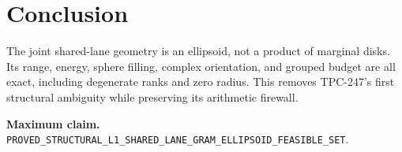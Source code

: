 \documentclass[11pt]{article}
\theoremstyle{remark}
\begin{document}
\section{Conclusion}

The joint shared-lane geometry is an ellipsoid, not a product of marginal
disks.  Its range, energy, sphere filling, complex orientation, and grouped
budget are all exact, including degenerate ranks and zero radius.  This removes
TPC-247's first structural ambiguity while preserving its arithmetic firewall.

\medskip
\noindent\textbf{Maximum claim.}
\texttt{PROVED\_STRUCTURAL\_L1\_SHARED\_LANE\_GRAM\_ELLIPSOID\_FEASIBLE\_SET}.



\end{document}

